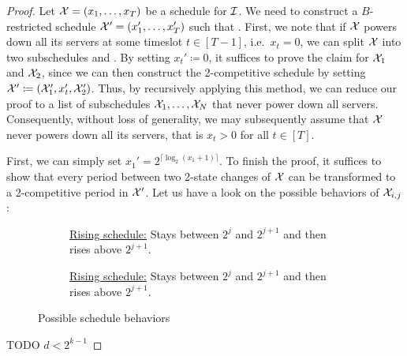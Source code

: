 \begin{proof}
Let $\mathcal{X}=(x_1,\dotsc,x_T)$ be a schedule for $\mathcal{I}$. We need to construct a $B$-restricted schedule $\mathcal{X}'=(x_1',\dotsc,x_T')$ such that .
First, we note that if $\mathcal{X}$ powers down all its servers at some timeslot $t\in[T-1]$, i.e.\ $x_t=0$, we can split $\mathcal{X}$ into two subschedules  and . By setting $x_t'\coloneqq0$, it suffices to prove the claim for $\mathcal{X}_1$ and $\mathcal{X}_2$, since we can then construct the 2-competitive schedule by setting $\mathcal{X}'\coloneqq(\mathcal{X}_1',x_t',\mathcal{X}_2')$. Thus, by recursively applying this method, we can reduce our proof to a list of subschedules $\mathcal{X}_1,\dotsc,\mathcal{X}_N$ that never power down all servers. Consequently, without loss of generality, we may subsequently assume that $\mathcal{X}$ never powers down all its servers, that is $x_t>0$ for all $t\in[T]$. 
	
First, we can simply set $x_1'=2^{\lceil\log_2(x_1+1)\rceil}$. To finish the proof, it suffices to show that every period between two 2-state changes of $\mathcal{X}$ can be transformed to a 2-competitive period in $\mathcal{X}'$. Let us have a look on the possible behaviors of $\mathcal{X}_{i,j}$:
\begin{figure}[H]
\captionsetup[subfigure]{labelformat=empty}
\begin{subfigure}[b]{0.47\textwidth}
	
\caption{\underline{Rising schedule:} Stays between $2^j$ and $2^{j+1}$ and then rises above $2^{j+1}$.}
\end{subfigure}
\hfill
\begin{subfigure}[b]{0.47\textwidth}
	
\caption{\underline{Rising schedule:} Stays between $2^j$ and $2^{j+1}$ and then rises above $2^{j+1}$.}
\end{subfigure}
\caption{Possible schedule behaviors}
\end{figure}
TODO $d<2^{k-1}$


\end{proof}
